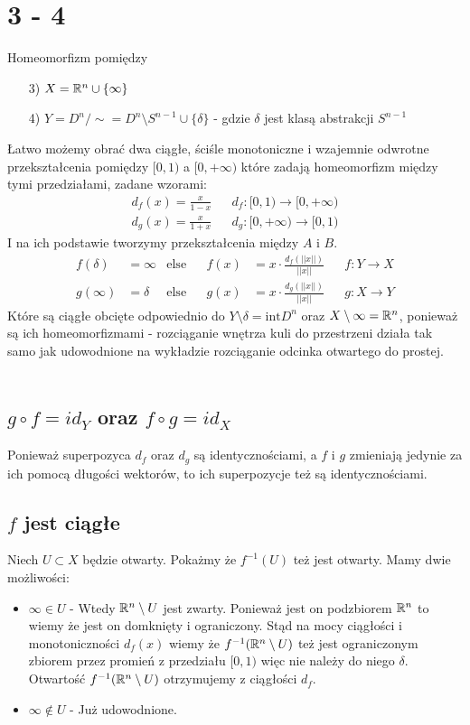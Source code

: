 \section*{3 - 4}
Homeomorfizm pomiędzy
\begin{itemize}
  \item[3)] $ X = {\mathbb{R}}^n \cup \{\infty\}$
  \item[4)] $Y = D^n / \sim = D^n \setminus S^{n-1} \cup \{ \delta \}$ - gdzie $\delta$ jest klasą abstrakcji $S^{n-1}$
\end{itemize}
Łatwo możemy obrać dwa ciągłe, ściśle monotoniczne i wzajemnie odwrotne przekształcenia pomiędzy $[0, 1)$ a $[0, +\infty)$ które zadają homeomorfizm między tymi przedziałami, zadane wzorami:
\begin{align*}
  d_f(x) = \tfrac{x}{1 - x} & & d_f : [0, 1) \to [0, +\infty) \\
  d_g(x) = \tfrac{x}{1 + x} & & d_g : [0, +\infty) \to [0, 1)
\end{align*}
I na ich podstawie tworzymy przekształcenia między $A$ i $B$.
\begin{align*}
  f(\delta) &= \infty & \text{else} & & f(x) &= x \cdot \tfrac{d_f(||x||)}{||x||} & & f : Y \to X \\
  g(\infty) &= \delta & \text{else} & & g(x) &= x \cdot \tfrac{d_g(||x||)}{||x||} & & g : X \to Y
\end{align*}
Które są ciągłe obcięte odpowiednio do $ Y \setminus \delta =  \text{int}{D^n}$ oraz $X \setminus \infty = {\mathbb{R}}^n$, ponieważ są ich homeomorfizmami - rozciąganie wnętrza kuli do przestrzeni działa tak samo jak udowodnione na wykładzie rozciąganie odcinka otwartego do prostej. \\
\\
\subsection*{$g \circ f = id_Y$ oraz $f \circ g = id_X$}
Ponieważ superpozyca $d_f$ oraz $d_g$ są identycznościami, a $f$ i $g$ zmieniają jedynie za ich pomocą długości wektorów, to ich superpozycje też są identycznościami.
\subsection*{$f$ jest ciągłe}
Niech $ U \subset X$ będzie otwarty. Pokażmy że $f^{-1}(U)$ też jest otwarty. Mamy dwie możliwości:
\begin{itemize}
  \item $\infty \in U$ - Wtedy ${\mathbb{R}}^n \setminus U$ jest zwarty. Ponieważ jest on podzbiorem ${\mathbb{R}}^n$ to wiemy że jest on domknięty i ograniczony. Stąd na mocy ciągłości i monotoniczności $d_f(x)$ wiemy że $f^{-1}({\mathbb{R}}^n \setminus U)$ też jest ograniczonym zbiorem przez promień z przedziału $[0,1)$ więc nie należy do niego $\delta$. Otwartość $f^{-1}({\mathbb{R}}^n \setminus U)$ otrzymujemy z ciągłości $d_f$.
  \item $\infty \not \in U$ - Już udowodnione.
\end{itemize}
